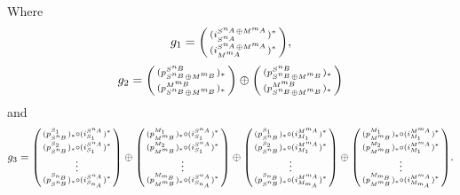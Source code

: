 \begin{remark}
    Where
    \[
        g_1 =
        \begin{psmallmatrix}
            ( i_{S^{n_A}}^{S^{n_A} \oplus M^{m_A}} )^* \\
            ( i_{M^{m_A}}^{S^{n_A} \oplus M^{m_A}} )^*
        \end{psmallmatrix},
    \]
    \[
        g_2 =
        \begin{psmallmatrix}
            ( p_{S^{n_B} \oplus M^{m_B}}^{S^{n_B}} )_* \\
            ( p_{S^{n_B} \oplus M^{m_B}}^{M^{m_B}} )_*
        \end{psmallmatrix}
        \oplus
        \begin{psmallmatrix}
            ( p_{S^{n_B} \oplus M^{m_B}}^{S^{n_B}} )_* \\
            ( p_{S^{n_B} \oplus M^{m_B}}^{M^{m_B}} )_*
        \end{psmallmatrix}
    \]
    and
    \begin{multline*}
        g_3 =
        \begin{psmallmatrix}
            (p_{S^{n_B}}^{S_1})_* \circ (i_{S_1}^{S^{n_A}})^* \\
            (p_{S^{n_B}}^{S_2})_* \circ (i_{S_1}^{S^{n_A}})^* \\
            \vdots \\
            (p_{S^{n_B}}^{S_{n_B}})_* \circ (i_{S_{n_A}}^{S^{n_A}})^*
        \end{psmallmatrix}
        \oplus
        \begin{psmallmatrix}
            (p_{M^{m_B}}^{M_1})_* \circ (i_{S_1}^{S^{n_A}})^* \\
            (p_{M^{m_B}}^{M_2})_* \circ (i_{S_1}^{S^{n_A}})^* \\
            \vdots \\
            (p_{M^{m_B}}^{M_{m_B}})_* \circ (i_{S_{n_A}}^{S^{n_A}})^*
        \end{psmallmatrix}
        \oplus
        \begin{psmallmatrix}
            (p_{S^{n_B}}^{S_1})_* \circ (i_{M_1}^{M^{m_A}})^* \\
            (p_{S^{n_B}}^{S_2})_* \circ (i_{M_1}^{M^{m_A}})^* \\
            \vdots \\
            (p_{S^{n_B}}^{S_{n_B}})_* \circ (i_{M_{m_A}}^{M^{m_A}})^*
        \end{psmallmatrix}
        \oplus
        \begin{psmallmatrix}
            (p_{M^{m_B}}^{M_1})_* \circ (i_{M_1}^{M^{m_A}})^* \\
            (p_{M^{m_B}}^{M_2})_* \circ (i_{M_1}^{M^{m_A}})^* \\
            \vdots \\
            (p_{M^{m_B}}^{M_{m_B}})_* \circ (i_{M_{m_A}}^{M^{m_A}})^*
        \end{psmallmatrix}.
    \end{multline*}


\end{remark}
